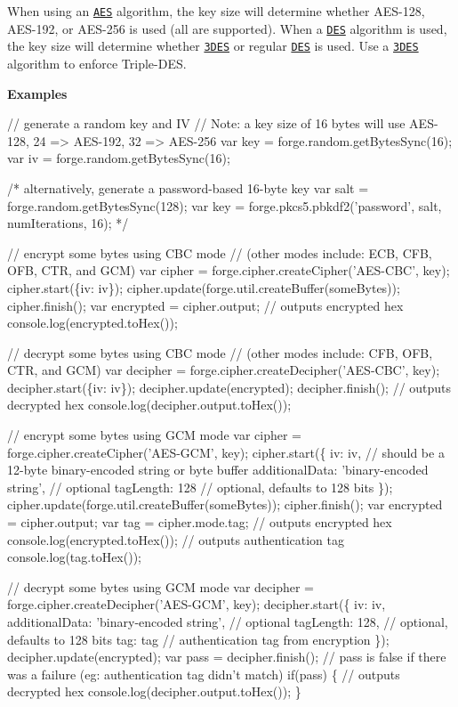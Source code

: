 When using an \href{http://en.wikipedia.org/wiki/Advanced_Encryption_Standard}{\tt A\+ES} algorithm, the key size will determine whether A\+E\+S-\/128, A\+E\+S-\/192, or A\+E\+S-\/256 is used (all are supported). When a \href{http://en.wikipedia.org/wiki/Data_Encryption_Standard}{\tt D\+ES} algorithm is used, the key size will determine whether \href{http://en.wikipedia.org/wiki/Triple_DES}{\tt 3\+D\+ES} or regular \href{http://en.wikipedia.org/wiki/Data_Encryption_Standard}{\tt D\+ES} is used. Use a \href{http://en.wikipedia.org/wiki/Triple_DES}{\tt 3\+D\+ES} algorithm to enforce Triple-\/\+D\+ES.

{\bfseries Examples}


\begin{DoxyCode}
// generate a random key and IV
// Note: a key size of 16 bytes will use AES-128, 24 => AES-192, 32 => AES-256
var key = forge.random.getBytesSync(16);
var iv = forge.random.getBytesSync(16);

/* alternatively, generate a password-based 16-byte key
var salt = forge.random.getBytesSync(128);
var key = forge.pkcs5.pbkdf2('password', salt, numIterations, 16);
*/

// encrypt some bytes using CBC mode
// (other modes include: ECB, CFB, OFB, CTR, and GCM)
var cipher = forge.cipher.createCipher('AES-CBC', key);
cipher.start(\{iv: iv\});
cipher.update(forge.util.createBuffer(someBytes));
cipher.finish();
var encrypted = cipher.output;
// outputs encrypted hex
console.log(encrypted.toHex());

// decrypt some bytes using CBC mode
// (other modes include: CFB, OFB, CTR, and GCM)
var decipher = forge.cipher.createDecipher('AES-CBC', key);
decipher.start(\{iv: iv\});
decipher.update(encrypted);
decipher.finish();
// outputs decrypted hex
console.log(decipher.output.toHex());

// encrypt some bytes using GCM mode
var cipher = forge.cipher.createCipher('AES-GCM', key);
cipher.start(\{
  iv: iv, // should be a 12-byte binary-encoded string or byte buffer
  additionalData: 'binary-encoded string', // optional
  tagLength: 128 // optional, defaults to 128 bits
\});
cipher.update(forge.util.createBuffer(someBytes));
cipher.finish();
var encrypted = cipher.output;
var tag = cipher.mode.tag;
// outputs encrypted hex
console.log(encrypted.toHex());
// outputs authentication tag
console.log(tag.toHex());

// decrypt some bytes using GCM mode
var decipher = forge.cipher.createDecipher('AES-GCM', key);
decipher.start(\{
  iv: iv,
  additionalData: 'binary-encoded string', // optional
  tagLength: 128, // optional, defaults to 128 bits
  tag: tag // authentication tag from encryption
\});
decipher.update(encrypted);
var pass = decipher.finish();
// pass is false if there was a failure (eg: authentication tag didn't match)
if(pass) \{
  // outputs decrypted hex
  console.log(decipher.output.toHex());
\}
\end{DoxyCode}


